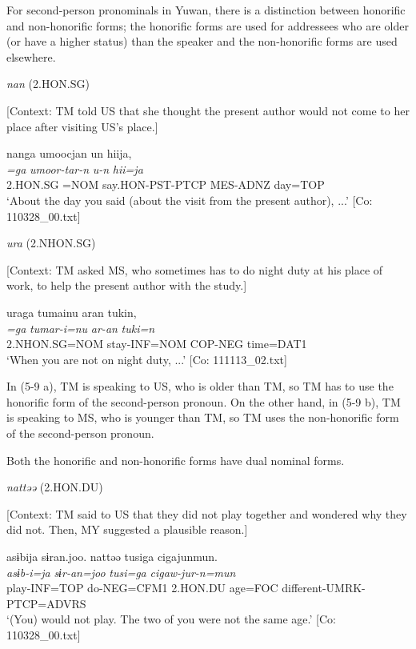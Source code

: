 For second-person pronominals in Yuwan, there is a distinction between honorific and non-honorific forms; the honorific forms are used for addressees who are older (or have a higher status) than the speaker and the non-honorific forms are used elsewhere.

\ea \label{ex:5:9}  \ea \label{ex:5:9a} \textit{nan} (2.HON.SG)

    [Context: TM told US that she thought the present author would not come to her place after visiting US’s place.]

\glll  nanga  umoocjan  un  hiija,\\
\textit{=ga}  \textit{umoor-tar-n}  \textit{u-n}  \textit{hii=ja}\\
2.HON.SG =NOM  say.HON-PST-PTCP  MES-ADNZ  day=TOP\\
\glt ‘About the day you said (about the visit from the present author), ...’ [Co: 110328\_00.txt]

 \ex \label{ex:5:b} \textit{ura} (2.NHON.SG)

    [Context: TM asked MS, who sometimes has to do night duty at his place of work, to help the present author with the study.]

\glll  uraga  tumainu  aran  tukin,\\
\textit{=ga}  \textit{tumar-i=nu}  \textit{ar-an}  \textit{tuki=n}\\
2.NHON.SG=NOM  stay-INF=NOM  COP-NEG  time=DAT1\\
\glt ‘When you are not on night duty, ...’ [Co: 111113\_02.txt]
\z
\z

In (5-9 a), TM is speaking to US, who is older than TM, so TM has to use the honorific form of the second-person pronoun. On the other hand, in (5-9 b), TM is speaking to MS, who is younger than TM, so TM uses the non-honorific form of the second-person pronoun.

  Both the honorific and non-honorific forms have dual nominal forms.

\ea \label{ex:5:10}  \ea \label{ex:5:10a} \textit{nattəə} (2.HON.DU)

    [Context: TM said to US that they did not play together and wondered why they did not. Then, MY suggested a plausible reason.]

\glll  asɨbija  sɨran.joo.  nattəə  tusiga   cigajunmun.\\
\textit{asɨb-i=ja}  \textit{sɨr-an=joo}  \textit{}  \textit{tusi=ga}  \textit{cigaw-jur-n=mun}\\
play-INF=TOP  do-NEG=CFM1  2.HON.DU  age=FOC  different-UMRK-PTCP=ADVRS\\
\glt ‘(You) would not play. The two of you were not the same age.’ [Co: 110328\_00.txt]


